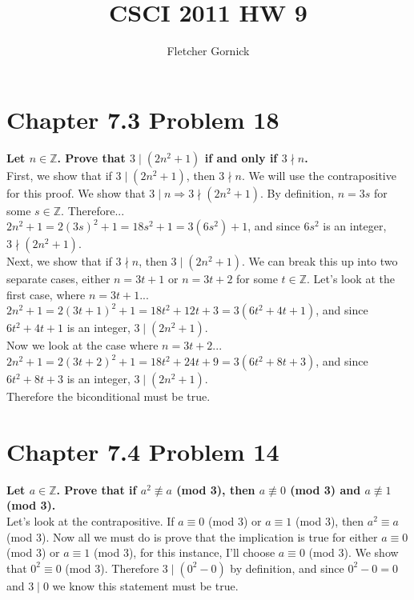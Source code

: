 \documentclass[10pt]{article}
\title{CSCI 2011 HW 9}
\author{Fletcher Gornick}
\begin{document}
\maketitle

\section{Chapter 7.3 Problem 18}
\textbf{Let $n \in \mathbb{Z}$.  Prove that $3 \mid (2n^2 + 1)$ if and only if $3 \nmid n$.} \\

First, we show that if $3 \mid (2n^2 + 1)$, then $3 \nmid n$.  We will use the contrapositive for this proof.  We show that
$3 \mid n \Rightarrow 3 \nmid (2n^2 + 1)$.  By definition, $n = 3s$ for some $s \in \mathbb{Z}$.  Therefore... \\
$2n^2 + 1 = 2(3s)^2 + 1 = 18s^2 + 1 = 3(6s^2) + 1$, and since $6s^2$ is an integer, $3 \nmid (2n^2 + 1)$. \\

Next, we show that if $3 \nmid n$, then $3 \mid (2n^2 + 1)$.  We can break this up into two separate cases, either $n = 3t + 1$ or $n = 3t + 2$
for some $t \in \mathbb{Z}$.  Let's look at the first case, where $n = 3t + 1$... \\
$2n^2 + 1 = 2(3t + 1)^2 + 1 = 18t^2 +12t + 3 = 3(6t^2 + 4t + 1)$, and since $6t^2 + 4t + 1$ is an integer, $3 \mid (2n^2 + 1)$. \\

Now we look at the case where $n = 3t + 2$... \\
$2n^2 + 1 = 2(3t + 2)^2 + 1 = 18t^2 + 24t + 9 = 3(6t^2 + 8t + 3)$, and since $6t^2 + 8t + 3$ is an integer, $3 \mid (2n^2 + 1)$. \\
Therefore the biconditional must be true.


\section{Chapter 7.4 Problem 14}
\textbf{Let $a \in \mathbb{Z}$.  Prove that if $a^2 \not\equiv a$ (mod 3), then $a \not\equiv 0$ (mod 3) and $a \not\equiv 1$ (mod 3).} \\

Let's look at the contrapositive.  If $a \equiv 0$ (mod 3) or $a \equiv 1$ (mod 3), then $a^2 \equiv a$ (mod 3).  Now all we must do is prove
that the implication is true for either $a \equiv 0$ (mod 3) or $a \equiv 1$ (mod 3), for this instance, I'll choose $a \equiv 0$ (mod 3).  We show
that $0^2 \equiv 0$ (mod 3).  Therefore $3 \mid (0^2 - 0)$ by definition, and since $0^2 - 0 = 0$ and $3 \mid 0$ we know this statement must be true.
\end{document}
